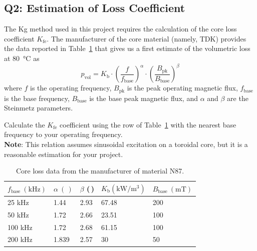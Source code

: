 \documentclass{PELsmallreport}
\begin{document}
 \hfill{}





\subsection{Q2: Estimation of Loss Coefficient} 

The Kg method used in this project requires the calculation of the core loss coefficient $K_\mathrm{fe}$.
The manufacturer of the core material (namely, TDK) provides the data reported in Table~\ref{tab:core_loss_data} that gives us a first estimate of the volumetric loss at \qty{80}{\celsius} as \\
\begin{equation}
    p_\mathrm{vol} = K_\mathrm{b} \cdot \left( \frac{f}{f_\mathrm{base}}\right)^{\alpha} \cdot \left( \frac{B_\mathrm{pk}}{B_\mathrm{base}}\right)^{\beta}
    \label{eq:Kfe}
\end{equation}
where $f$ is the operating frequency, $B_\mathrm{pk}$ is the peak operating magnetic flux, $f_\mathrm{base}$ is the base frequency, $B_\mathrm{base}$ is the base peak magnetic flux, and $\alpha$ and $\beta$ are the Steinmetz parameters. 

Calculate the $K_\mathrm{fe}$ coefficient using the row of Table~\ref{tab:core_loss_data} with the nearest base frequency to your operating frequency.   
\\
\textbf{Note}: This relation assumes sinusoidal excitation on a toroidal core, but it is a reasonable estimation for your project. 


\begin{table}[!h]
    \centering
    \caption{Core loss data from the manufacturer of material N87. }
    \label{tab:core_loss_data}
    \begin{tabular}{|l|l|l|l|l|}
    \hline
    $f_\mathrm{base} \: (\mathrm{kHz})  $ & $\alpha \: (\,) $ & $\beta$  \: (\,) & $K_\mathrm{b} (\mathrm{kW}/\mathrm{m^3})$ & $B_\mathrm{base} \: (\mathrm{mT}) $  \\
    \hline
    25 kHz            & 1.44    & 2.93  & 67.48 &  200              \\
    \hline
    50 kHz            & 1.72    & 2.66  & 23.51 &  100              \\
    \hline
    100 kHz           & 1.72    & 2.68  & 61.15 &  100              \\
    \hline
    200 kHz           & 1.839   & 2.57  & 30 &  50               \\            
    \hline
    \end{tabular}
\end{table}
\end{document}
